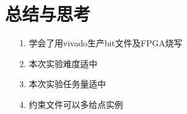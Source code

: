 \documentclass{article}
\begin{document}
    \section{总结与思考}
	\begin{enumerate}
		\item [1.]学会了用vivado生产bit文件及FPGA烧写
		\item [2.]本次实验难度适中
		\item [3.]本次实验任务量适中
		\item [4.]约束文件可以多给点实例
	\end{enumerate}
\end{document}
